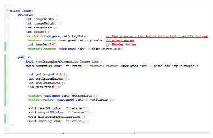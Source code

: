\documentclass{article}
\begin{document}
\begin{figure}[h]
 \centering
 \includegraphics[width=\linewidth]{ImageClass.png}
\end{figure}














\end{document}
